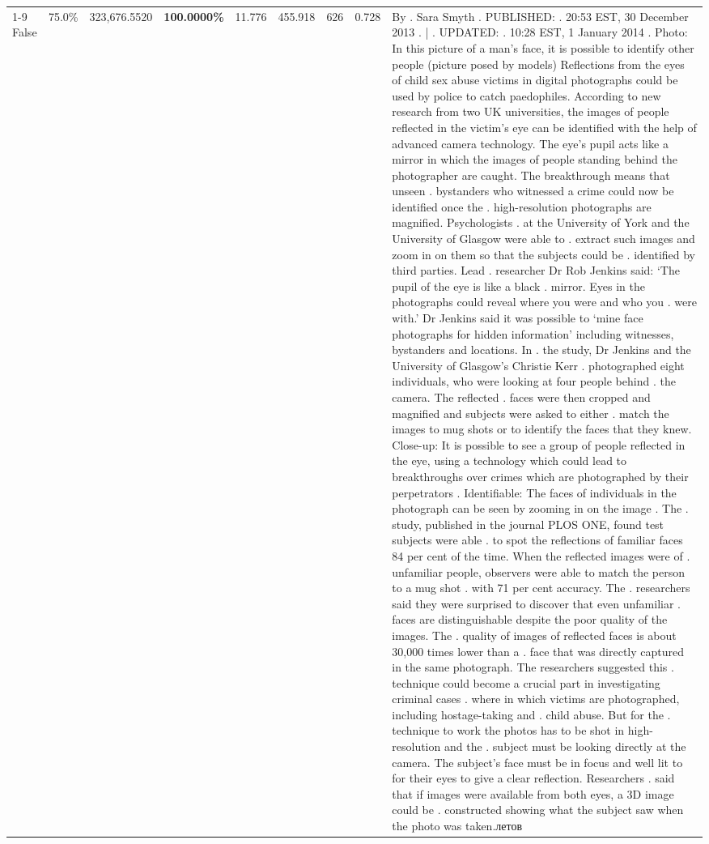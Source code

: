 \begin{table}[H]
\begin{tabular}{lllrlllll}
\cline{1-9}
False & 75.0\% & 323,676.5520 & \bfseries \color{red} 100.0000\% & 11.776 & 455.918 & 626 & 0.728 & By . Sara Smyth . PUBLISHED: . 20:53 EST, 30 December 2013 . | . UPDATED: . 10:28 EST, 1 January 2014 . Photo: In this picture of a man's face, it is possible to identify other people (picture posed by models) Reflections from the eyes of child sex abuse victims in digital photographs could be used by police to catch paedophiles. According to new research from two UK universities, the images of people reflected in the victim's eye can be identified with the help of advanced camera technology. The eye's pupil acts like a mirror in which the images of people standing behind the photographer are caught. The breakthrough means that unseen . bystanders who witnessed a crime could now be identified once the . high-resolution photographs are magnified. Psychologists . at the University of York and the University of Glasgow were able to . extract such images and zoom in on them so that the subjects could be . identified by third parties. Lead . researcher Dr Rob Jenkins said: ‘The pupil of the eye is like a black . mirror. Eyes in the photographs could reveal where you were and who you . were with.' Dr Jenkins said it was possible to ‘mine face photographs for hidden information' including witnesses, bystanders and locations. In . the study, Dr Jenkins and the University of Glasgow's Christie Kerr . photographed eight individuals, who were looking at four people behind . the camera. The reflected . faces were then cropped and magnified and subjects were asked to either . match the images to mug shots or to identify the faces that they knew. Close-up: It is possible to see a group of people reflected in the eye, using a technology which could lead to breakthroughs over crimes which are photographed by their perpetrators . Identifiable: The faces of individuals in the photograph can be seen by zooming in on the image . The . study, published in the journal PLOS ONE, found test subjects were able . to spot the reflections of familiar faces 84 per cent of the time. When the reflected images were of . unfamiliar people, observers were able to match the person to a mug shot . with 71 per cent accuracy. The . researchers said they were surprised to discover that even unfamiliar . faces are distinguishable despite the poor quality of the images. The . quality of images of reflected faces is about 30,000 times lower than a . face that was directly captured in the same photograph. The researchers suggested this . technique could become a crucial part in investigating criminal cases . where in which victims are photographed, including hostage-taking and . child abuse. But for the . technique to work the photos has to be shot in high-resolution and the . subject must be looking directly at the camera. The subject's face must be in focus and well lit to for their eyes to give a clear reflection. Researchers . said that if images were available from both eyes, a 3D image could be . constructed showing what the subject saw when the photo was taken.летов \\

\end{tabular}
\end{table}
